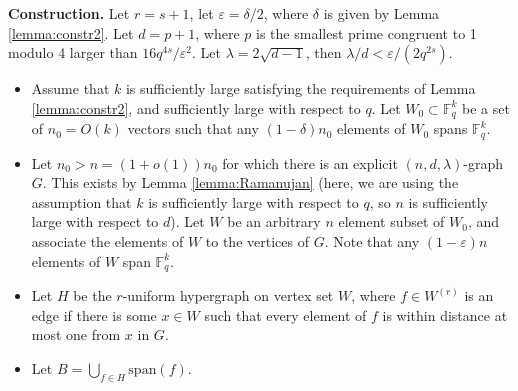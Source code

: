 \documentclass[11pt]{article}
\theoremstyle{plain}
\theoremstyle{definition}
\begin{document}
\noindent
\textbf{Construction.} Let $r=s+1$, let $\varepsilon=\delta/2$, where $\delta$ is given by Lemma \ref{lemma:constr2}. Let $d=p+1$, where $p$ is the smallest prime congruent to 1 modulo 4 larger than $16q^{4s}/\varepsilon^2$. Let $\lambda=2\sqrt{d-1}$, then $\lambda/d<\varepsilon /(2q^{2s})$. 
\begin{itemize}
    \item Assume that $k$ is sufficiently large satisfying the requirements of Lemma \ref{lemma:constr2}, and sufficiently large with respect to $q$. Let $W_0\subset \mathbb{F}_q^k$ be a set of $n_0=O(k)$ vectors such that any $(1-\delta)n_0$ elements of $W_0$ spans $\mathbb{F}_q^k$.
    \item Let $n_0>n=(1+o(1))n_0$ for which there is an explicit $(n,d,\lambda)$-graph $G$. This exists by Lemma \ref{lemma:Ramanujan} (here, we are using the assumption that $k$ is sufficiently large with respect to $q$, so $n$ is sufficiently large with respect to $d$). Let $W$ be an arbitrary $n$ element subset of $W_0$, and associate the elements of $W$ to the vertices of $G$. Note that any $(1-\varepsilon)n$ elements of $W$ span $\mathbb{F}_q^k$.

    \item Let $H$ be the $r$-uniform hypergraph on vertex set $W$, where $f\in W^{(r)}$ is an edge if there is some $x\in W$ such that every element of $f$ is within distance at most one from $x$ in $G$.

    \item Let $B=\bigcup_{f\in H}\mbox{span}(f)$.
\end{itemize}
\end{document}
